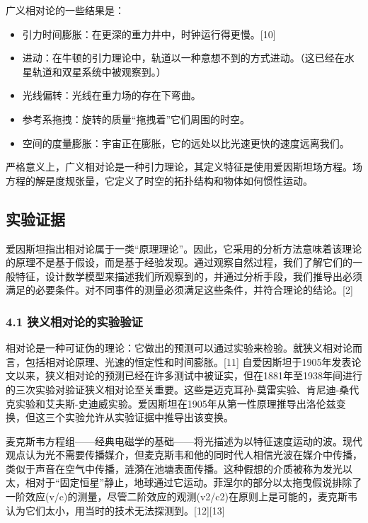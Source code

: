 广义相对论的一些结果是：

\begin{itemize}
\item 引力时间膨胀：在更深的重力井中，时钟运行得更慢。[10]
\item 进动：在牛顿的引力理论中，轨道以一种意想不到的方式进动。（这已经在水星轨道和双星系统中被观察到。）
\item 光线偏转：光线在重力场的存在下弯曲。
\item 参考系拖拽：旋转的质量“拖拽着”它们周围的时空。
\item 空间的度量膨胀：宇宙正在膨胀，它的远处以比光速更快的速度远离我们。
\end{itemize}

严格意义上，广义相对论是一种引力理论，其定义特征是使用爱因斯坦场方程。场方程的解是度规张量，它定义了时空的拓扑结构和物体如何惯性运动。

\subsection{实验证据}

爱因斯坦指出相对论属于一类“原理理论”。因此，它采用的分析方法意味着该理论的原理不是基于假设，而是基于经验发现。通过观察自然过程，我们了解它们的一般特征，设计数学模型来描述我们所观察到的，并通过分析手段，我们推导出必须满足的必要条件。对不同事件的测量必须满足这些条件，并符合理论的结论。[2]

\subsubsection{4.1 狭义相对论的实验验证}

相对论是一种可证伪的理论：它做出的预测可以通过实验来检验。就狭义相对论而言，包括相对论原理、光速的恒定性和时间膨胀。[11] 自爱因斯坦于1905年发表论文以来，狭义相对论的预测已经在许多测试中被证实，但在1881年至1938年间进行的三次实验对验证狭义相对论至关重要。这些是迈克耳孙-莫雷实验、肯尼迪-桑代克实验和艾夫斯-史迪威实验。爱因斯坦在1905年从第一性原理推导出洛伦兹变换，但这三个实验允许从实验证据中推导出该变换。

麦克斯韦方程组——经典电磁学的基础——将光描述为以特征速度运动的波。现代观点认为光不需要传播媒介，但麦克斯韦和他的同时代人相信光波在媒介中传播，类似于声音在空气中传播，涟漪在池塘表面传播。这种假想的介质被称为发光以太，相对于“固定恒星”静止，地球通过它运动。菲涅尔的部分以太拖曳假说排除了一阶效应(v/c)的测量，尽管二阶效应的观测(v2/c2)在原则上是可能的，麦克斯韦认为它们太小，用当时的技术无法探测到。[12][13]

